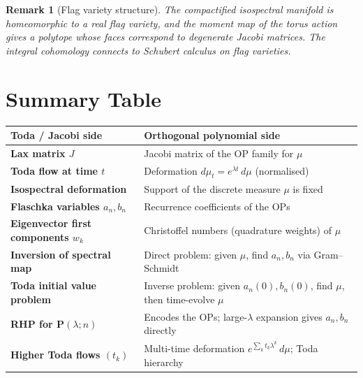 \documentclass[12pt,a4paper]{article}
\newtheorem{remark}[theorem]{Remark}
\theoremstyle{definition}
\begin{document}
\begin{remark}[Flag variety structure]
The compactified isospectral manifold is homeomorphic to a \emph{real flag
variety}, and the moment map of the torus action gives a polytope whose
faces correspond to degenerate Jacobi matrices.  The integral cohomology
connects to Schubert calculus on flag varieties.
\end{remark}

\section{Summary Table}

\begin{center}
\renewcommand{\arraystretch}{1.5}
\begin{tabular}{>{\bfseries}p{5.2cm} p{8.8cm}}
\toprule
Toda / Jacobi side & Orthogonal polynomial side \\
\midrule
Lax matrix $J$ &
  Jacobi matrix of the OP family for $\mu$ \\
Toda flow at time $t$ &
  Deformation $d\mu_t = e^{\lambda t}\,d\mu$ (normalised) \\
Isospectral deformation &
  Support of the discrete measure $\mu$ is fixed \\
Flaschka variables $a_n,b_n$ &
  Recurrence coefficients of the OPs \\
Eigenvector first components $w_k$ &
  Christoffel numbers (quadrature weights) of $\mu$ \\
Inversion of spectral map &
  Direct problem: given $\mu$, find $a_n,b_n$ via Gram--Schmidt \\
Toda initial value problem &
  Inverse problem: given $a_n(0),b_n(0)$, find $\mu$,
  then time-evolve $\mu$ \\
RHP for $\mathbf{P}(\lambda;n)$ &
  Encodes the OPs; large-$\lambda$ expansion gives $a_n,b_n$ directly \\
Higher Toda flows $(t_k)$ &
  Multi-time deformation $e^{\sum_k t_k\lambda^k}\,d\mu$;
  Toda hierarchy \\
\bottomrule
\end{tabular}
\end{center}
\end{document}
